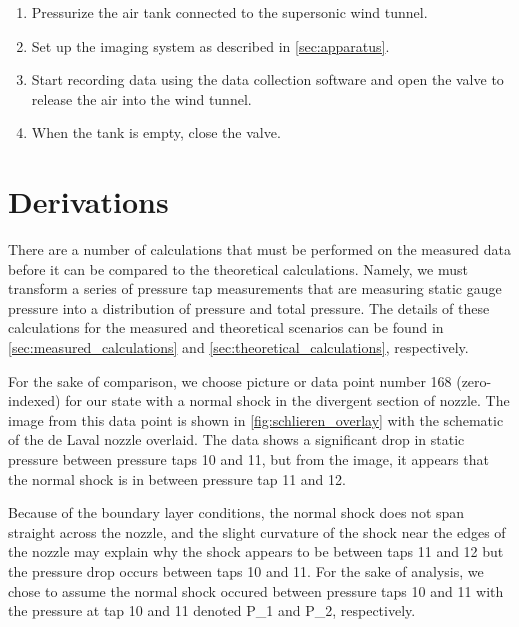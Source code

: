 \begin{enumerate}
    \item Pressurize the air tank connected to the supersonic wind tunnel.
    \item Set up the imaging system as described in \autoref{sec:apparatus}.
    \item Start recording data using the data collection software and open the valve to release the air into the wind tunnel.
    \item When the tank is empty, close the valve.
\end{enumerate}

\section{Derivations} \label{sec:derivations}

There are a number of calculations that must be performed on the measured data before it can be compared to the theoretical calculations. Namely, we must transform a series of pressure tap measurements that are measuring static gauge pressure into a distribution of pressure and total pressure. The details of these calculations for the measured and theoretical scenarios can be found in \autoref{sec:measured_calculations} and \autoref{sec:theoretical_calculations}, respectively.

For the sake of comparison, we choose picture or data point number \num{168} (zero-indexed) for our state with a normal shock in the divergent section of nozzle. The image from this data point is shown in \autoref{fig:schlieren_overlay} with the schematic of the de Laval nozzle overlaid. The data shows a significant drop in static pressure between pressure taps \num{10} and \num{11}, but from the image, it appears that the normal shock is in between pressure tap \num{11} and \num{12}.

Because of the boundary layer conditions, the normal shock does not span straight across the nozzle, and the slight curvature of the shock near the edges of the nozzle may explain why the shock appears to be between taps \num{11} and \num{12} but the pressure drop occurs between taps \num{10} and \num{11}. For the sake of analysis, we chose to assume the normal shock occured between pressure taps \num{10} and \num{11} with the pressure at tap \num{10} and \num{11} denoted \gls{P_1} and \gls{P_2}, respectively.

